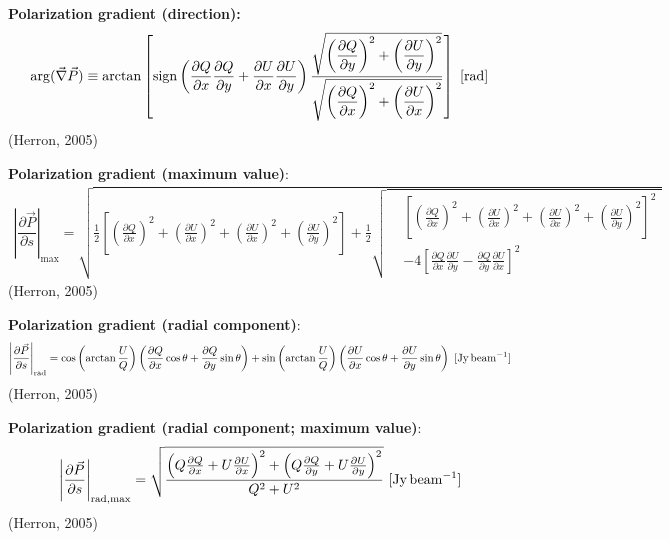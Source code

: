 \documentclass[a4paper,10pt]{article}
\begin{document}
{\noindent}\textbf{Polarization gradient (direction):}
\begin{align*}
    \mathrm{arg}(\vec\nabla\vec{P}) \equiv \arctan \left[ \mathrm{sign} \left(\dfrac{\partial Q}{\partial x}\dfrac{\partial Q}{\partial y} + \dfrac{\partial U}{\partial x}\dfrac{\partial U}{\partial y}\right) \dfrac{\sqrt{\left(\dfrac{\partial Q}{\partial y}\right)^2 + \left(\dfrac{\partial U}{\partial y}\right)^2}}{\sqrt{\left(\dfrac{\partial Q}{\partial x}\right)^2 + \left(\dfrac{\partial U}{\partial x}\right)^2}} \right] ~ [\rm rad]
\end{align*}
(Herron, 2005)

{\noindent}\textbf{Polarization gradient (maximum value)}:
\begin{equation*}
\begin{split}
\left\lvert\dfrac{\partial\vec{P}}{\partial s}\right\rvert_\mathrm{max} = \sqrt{ \frac{1}{2}\left[ \left(\frac{\partial Q}{\partial x}\right)^2 + \left(\frac{\partial U}{\partial x}\right)^2 + \left(\frac{\partial U}{\partial x}\right)^2 + \left(\frac{\partial U}{\partial y}\right)^2 \right] + \frac{1}{2} 
  \sqrt{
    \begin{aligned}
    & \left[ \left(\frac{\partial Q}{\partial x}\right)^2 + \left(\frac{\partial U}{\partial x}\right)^2 + \left(\frac{\partial U}{\partial x}\right)^2 + \left(\frac{\partial U}{\partial y}\right)^2 \right]^2 \\
    &- 4\left[ \frac{\partial Q}{\partial x}\frac{\partial U}{\partial y} - \frac{\partial Q}{\partial y}\frac{\partial U}{\partial x}  \right]^2
    \end{aligned}
    }}
\end{split}
\end{equation*}
(Herron, 2005)

{\noindent}\textbf{Polarization gradient (radial component)}:
\begin{align*}
	\left\lvert\dfrac{\partial\vec{P}}{\partial s}\right\rvert_\mathrm{rad} = \cos\left(\arctan\frac{U}{Q}\right)\left(\frac{\partial Q}{\partial x}\cos\theta+\frac{\partial Q}{\partial y}\sin\theta\right) + \sin\left(\arctan\frac{U}{Q}\right)\left(\frac{\partial U}{\partial x}\cos\theta+\frac{\partial U}{\partial y}\sin\theta\right) ~ [\rm Jy\,beam^{-1}]
\end{align*}
(Herron, 2005)

{\noindent}\textbf{Polarization gradient (radial component; maximum value)}:
\begin{align*}
	\left\lvert\dfrac{\partial\vec{P}}{\partial s}\right\rvert_\mathrm{rad,max} = \sqrt{\frac{\left(Q\frac{\partial Q}{\partial x}+U\frac{\partial U}{\partial x}\right)^2 +\left(Q\frac{\partial Q}{\partial y}+U\frac{\partial U}{\partial y}\right)^2}{Q^2+U^2}} ~ [\rm Jy\,beam^{-1}]
\end{align*}
(Herron, 2005)
\end{document}

